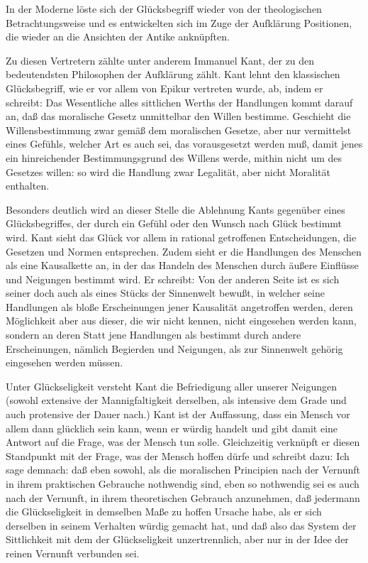 In der Moderne löste sich der Glücksbegriff wieder von der theologischen Betrachtungsweise und es entwickelten sich im Zuge der Aufklärung Positionen, die wieder an die Ansichten der Antike anknüpften. 

Zu diesen Vertretern zählte unter anderem Immanuel Kant, der zu den bedeutendsten Philosophen der Aufklärung zählt. 
Kant lehnt den klassischen Glücksbegriff, wie er vor allem von Epikur vertreten wurde, ab, indem er schreibt: \glqq Das Wesentliche alles sittlichen Werths der Handlungen kommt darauf an, daß das moralische Gesetz unmittelbar den Willen bestimme. 
Geschieht die Willensbestimmung zwar gemäß dem moralischen Gesetze, aber nur vermittelst eines Gefühls, welcher Art es auch sei, das vorausgesetzt werden muß, damit jenes ein hinreichender Bestimmungsgrund des Willens werde, mithin nicht um des Gesetzes willen: so wird die Handlung zwar Legalität, aber nicht Moralität enthalten.\grqq{} \cite[S.\,71]{IK74}

Besonders deutlich wird an dieser Stelle die Ablehnung Kants gegenüber eines Glücksbegriffes, der durch ein Gefühl oder den Wunsch nach Glück bestimmt wird. 
Kant sieht das Glück vor allem in rational getroffenen Entscheidungen, die Gesetzen und Normen entsprechen. 
Zudem sieht er die Handlungen des Menschen als eine Kausalkette an, in der das Handeln des Menschen durch äußere Einflüsse und Neigungen bestimmt wird. 
Er schreibt: \glqq Von der anderen Seite ist es sich seiner doch auch als eines Stücks der Sinnenwelt bewußt, in welcher seine Handlungen als bloße Erscheinungen jener Kausalität angetroffen werden, deren Möglichkeit aber aus dieser, die wir nicht kennen, nicht eingesehen werden kann, sondern an deren Statt jene Handlungen als bestimmt durch andere Erscheinungen, nämlich Begierden und Neigungen, als zur Sinnenwelt gehörig eingesehen werden müssen.\grqq{} \cite[S.\,79f]{IK65}

Unter Glückseligkeit versteht Kant \glqq die Befriedigung aller unserer Neigungen (sowohl extensive der Mannigfaltigkeit derselben, als intensive dem Grade und auch protensive der Dauer nach.)\grqq{} \cite[S.\,523]{IK73} 
Kant ist der Auffassung, dass ein Mensch vor allem dann glücklich sein kann, wenn er würdig handelt und gibt damit eine Antwort auf die Frage, was der Mensch tun solle. 
Gleichzeitig verknüpft er diesen Standpunkt mit der Frage, was der Mensch hoffen dürfe und schreibt dazu: \glqq Ich sage demnach: daß eben sowohl, als die moralischen Principien nach der Vernunft in ihrem praktischen Gebrauche nothwendig sind, eben so nothwendig sei es auch nach der Vernunft, in ihrem theoretischen Gebrauch anzunehmen, daß jedermann die Glückseligkeit in demselben Maße zu hoffen Ursache habe, als er sich derselben in seinem Verhalten würdig gemacht hat, und daß also das System der Sittlichkeit mit dem der Glückseligkeit unzertrennlich, aber nur in der Idee der reinen Vernunft verbunden sei.\grqq{} \cite[S.\,525]{IK73}

